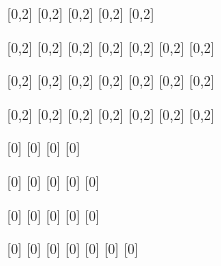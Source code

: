\documentclass{standalone}
\begin{document}
  \begin{karnaugh-map}[4][2][1]
    [0,2]
    [0,2]
    [0,2]
    [0,2]
    [0,2]
  \end{karnaugh-map}
  \begin{karnaugh-map}[4][4][1]
    [0,2]
    [0,2]
    [0,2]
    [0,2]
    [0,2]
    [0,2]
    [0,2]
  \end{karnaugh-map}
  \begin{karnaugh-map}[4][4][2]
    [0,2]
    [0,2]
    [0,2]
    [0,2]
    [0,2]
    [0,2]
    [0,2]
  \end{karnaugh-map}
  \begin{karnaugh-map}[4][4][4]
    [0,2]
    [0,2]
    [0,2]
    [0,2]
    [0,2]
    [0,2]
    [0,2]
  \end{karnaugh-map}
  \begin{karnaugh-map}[2][2][1]
    [0]
    [0]
    [0]
    [0]
  \end{karnaugh-map}
  \begin{karnaugh-map}[2][4][1]
    [0]
    [0]
    [0]
    [0]
    [0]
  \end{karnaugh-map}
  \begin{karnaugh-map}[4][2][1]
    [0]
    [0]
    [0]
    [0]
    [0]
  \end{karnaugh-map}
  \begin{karnaugh-map}[4][4][1]
    [0]
    [0]
    [0]
    [0]
    [0]
    [0]
    [0]
  \end{karnaugh-map}
\end{document}
